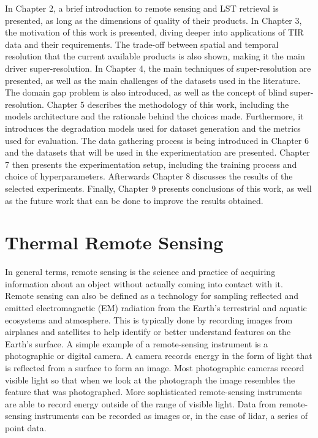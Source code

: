 In Chapter 2, a brief introduction to remote sensing and LST retrieval is presented, as long as the dimensions of quality of their products.
In Chapter 3, the motivation of this work is presented, diving deeper into applications of TIR data and their requirements.
The trade-off between spatial and temporal resolution that the current available products is also shown, making it the main driver super-resolution.
In Chapter 4, the main techniques of super-resolution are presented, as well as the main challenges of the datasets used in the literature.
The domain gap problem is also introduced, as well as the concept of blind super-resolution.
Chapter 5 describes the methodology of this work, including the models architecture and the rationale behind the choices made. Furthermore, it introduces the degradation models used for dataset generation and the metrics used for evaluation.
The data gathering process is being introduced in Chapter 6 and the datasets that will be used in the experimentation are presented.
Chapter 7 then presents the experimentation setup, including the training process and choice of hyperparameters.
Afterwards Chapter 8 discusses the results of the selected experiments.
Finally, Chapter 9 presents conclusions of this work, as well as the future work that can be done to improve the results obtained.
    
\section{Thermal Remote Sensing} \label{sec:thermal_remote_sensing}

In general terms, remote sensing is the science and practice of acquiring information about an object without actually coming into contact with it.
Remote sensing can also be defined as a technology for sampling reflected and emitted electromagnetic (EM) radiation from the Earth’s terrestrial and aquatic ecosystems and atmosphere.
This is typically done by recording images from airplanes and satellites to help identify or better understand features on the Earth’s surface.
A simple example of a remote-sensing instrument is a photographic or digital camera.
A camera records energy in the form of light that is reflected from a surface to form an image.
Most photographic cameras record visible light so that when we look at the photograph the image resembles the feature that was photographed.
More sophisticated remote-sensing instruments are able to record energy outside of the range of visible light.
Data from remote-sensing instruments can be recorded as images or, in the case of lidar, a series of point data.

